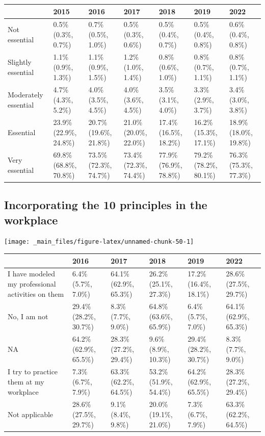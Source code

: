 \documentclass[
]{book}
\begin{document}
\begin{table}
\centering
\begin{tabular}[t]{>{}l|>{}l|>{}l|>{}l|>{}l|>{}l|>{}l}
\hline
  & 2015 & 2016 & 2017 & 2018 & 2019 & 2022\\
\hline
Not essential & 0.5\% (0.3\%, 0.7\%) & 0.7\% (0.5\%, 1.0\%) & 0.5\% (0.3\%, 0.6\%) & 0.5\% (0.4\%, 0.7\%) & 0.5\% (0.4\%, 0.8\%) & 0.6\% (0.4\%, 0.8\%)\\
\hline
Slightly essential & 1.1\% (0.9\%, 1.3\%) & 1.1\% (0.9\%, 1.5\%) & 1.2\% (1.0\%, 1.4\%) & 0.8\% (0.6\%, 1.0\%) & 0.8\% (0.7\%, 1.1\%) & 0.8\% (0.7\%, 1.1\%)\\
\hline
Moderately essential & 4.7\% (4.3\%, 5.2\%) & 4.0\% (3.5\%, 4.5\%) & 4.0\% (3.6\%, 4.5\%) & 3.5\% (3.1\%, 4.0\%) & 3.3\% (2.9\%, 3.7\%) & 3.4\% (3.0\%, 3.8\%)\\
\hline
Essential & 23.9\% (22.9\%, 24.8\%) & 20.7\% (19.6\%, 21.8\%) & 21.0\% (20.0\%, 22.0\%) & 17.4\% (16.5\%, 18.2\%) & 16.2\% (15.3\%, 17.1\%) & 18.9\% (18.0\%, 19.8\%)\\
\hline
Very essential & 69.8\% (68.8\%, 70.8\%) & 73.5\% (72.3\%, 74.7\%) & 73.4\% (72.3\%, 74.4\%) & 77.9\% (76.9\%, 78.8\%) & 79.2\% (78.2\%, 80.1\%) & 76.3\% (75.3\%, 77.3\%)\\
\hline
\end{tabular}
\end{table}

\hypertarget{incorporating-the-10-principles-in-the-workplace}{%
\subsection{Incorporating the 10 principles in the workplace}\label{incorporating-the-10-principles-in-the-workplace}}

\texttt{[image: \_main\_files/figure-latex/unnamed-chunk-50-1]}

\begin{table}
\centering
\begin{tabular}[t]{>{}l|>{}l|>{}l|>{}l|>{}l|>{}l}
\hline
  & 2016 & 2017 & 2018 & 2019 & 2022\\
\hline
I have modeled my 
 professional activities 
 on them & 6.4\% (5.7\%, 7.0\%) & 64.1\% (62.9\%, 65.3\%) & 26.2\% (25.1\%, 27.3\%) & 17.2\% (16.4\%, 18.1\%) & 28.6\% (27.5\%, 29.7\%)\\
\hline
No, I am not & 29.4\% (28.2\%, 30.7\%) & 8.3\% (7.7\%, 9.0\%) & 64.8\% (63.6\%, 65.9\%) & 6.4\% (5.7\%, 7.0\%) & 64.1\% (62.9\%, 65.3\%)\\
\hline
NA & 64.2\% (62.9\%, 65.5\%) & 28.3\% (27.2\%, 29.4\%) & 9.6\% (8.9\%, 10.3\%) & 29.4\% (28.2\%, 30.7\%) & 8.3\% (7.7\%, 9.0\%)\\
\hline
I try to practice them 
 at my workplace & 7.3\% (6.7\%, 7.9\%) & 63.3\% (62.2\%, 64.5\%) & 53.2\% (51.9\%, 54.4\%) & 64.2\% (62.9\%, 65.5\%) & 28.3\% (27.2\%, 29.4\%)\\
\hline
Not applicable & 28.6\% (27.5\%, 29.7\%) & 9.1\% (8.4\%, 9.8\%) & 20.0\% (19.1\%, 21.0\%) & 7.3\% (6.7\%, 7.9\%) & 63.3\% (62.2\%, 64.5\%)\\
\hline
\end{tabular}
\end{table}
\end{document}
